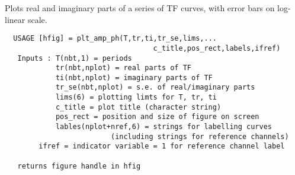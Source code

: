 Plots real and imaginary parts of a series of TF curves, with error bars
on log-linear scale.

\small
\begin{verbatim}
  USAGE [hfig] = plt_amp_ph(T,tr,ti,tr_se,lims,...
                                   c_title,pos_rect,labels,ifref)
   Inputs : T(nbt,1) = periods
            tr(nbt,nplot) = real parts of TF
            ti(nbt,nplot) = imaginary parts of TF
            tr_se(nbt,nplot) = s.e. of real/imaginary parts
            lims(6) = plotting limts for T, tr, ti
            c_title = plot title (character string)
            pos_rect = position and size of figure on screen
            lables(nplot+nref,6) = strings for labelling curves
                         (including strings for reference channels)
 	    ifref = indicator variable = 1 for reference channel label

   returns figure handle in hfig
\end{verbatim}
\normalsize
